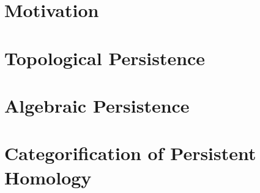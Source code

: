 \documentclass[b5paper, 11pt, twoside]{report}
\begin{document}
\newpage
\tableofcontents

\newpage
\listoffigures

\singlespacing
\chapter{Motivation}


\chapter{Topological Persistence}


\chapter{Algebraic Persistence}


\chapter{Categorification of Persistent Homology}


\singlespacing
\printbibliography

\newpage
\printindex
\end{document}
